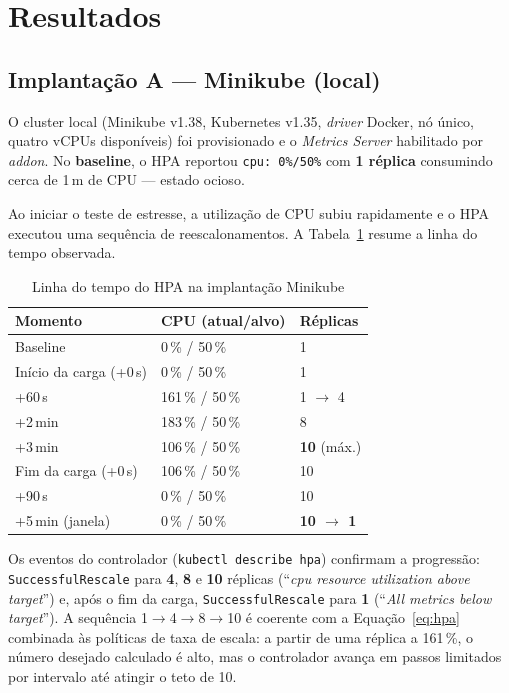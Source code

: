 \documentclass[conference]{IEEEtran}
\begin{document}
\section{Resultados}\label{sec:res}
\subsection{Implantação A --- Minikube (local)}
O cluster local (Minikube v1.38, Kubernetes v1.35, \textit{driver} Docker, nó único, quatro vCPUs
disponíveis) foi provisionado e o \textit{Metrics Server} habilitado por \textit{addon}. No
\textbf{baseline}, o HPA reportou \texttt{cpu: 0\%/50\%} com \textbf{1 réplica} consumindo cerca
de 1\,m de CPU --- estado ocioso.

Ao iniciar o teste de estresse, a utilização de CPU subiu rapidamente e o HPA executou uma
sequência de reescalonamentos. A Tabela~\ref{tab:minikube} resume a linha do tempo observada.

\begin{table}[!t]
\caption{Linha do tempo do HPA na implantação Minikube}
\label{tab:minikube}
\centering
\footnotesize
\begin{tabular}{@{}lll@{}}
\toprule
\textbf{Momento} & \textbf{CPU (atual/alvo)} & \textbf{Réplicas} \\
\midrule
Baseline & 0\,\% / 50\,\% & 1 \\
Início da carga (+0\,s) & 0\,\% / 50\,\% & 1 \\
+60\,s & 161\,\% / 50\,\% & 1 $\to$ 4 \\
+2\,min & 183\,\% / 50\,\% & 8 \\
+3\,min & 106\,\% / 50\,\% & \textbf{10} (máx.) \\
Fim da carga (+0\,s) & 106\,\% / 50\,\% & 10 \\
+90\,s & 0\,\% / 50\,\% & 10 \\
+5\,min (janela) & 0\,\% / 50\,\% & \textbf{10 $\to$ 1} \\
\bottomrule
\end{tabular}
\end{table}

Os eventos do controlador (\texttt{kubectl describe hpa}) confirmam a progressão:
\texttt{SuccessfulRescale} para \textbf{4}, \textbf{8} e \textbf{10} réplicas (``\textit{cpu
resource utilization above target}'') e, após o fim da carga, \texttt{SuccessfulRescale} para
\textbf{1} (``\textit{All metrics below target}''). A sequência 1$\to$4$\to$8$\to$10 é coerente
com a Equação~\ref{eq:hpa} combinada às políticas de taxa de escala: a partir de uma réplica a
161\,\%, o número desejado calculado é alto, mas o controlador avança em passos limitados por
intervalo até atingir o teto de 10.
\end{document}
